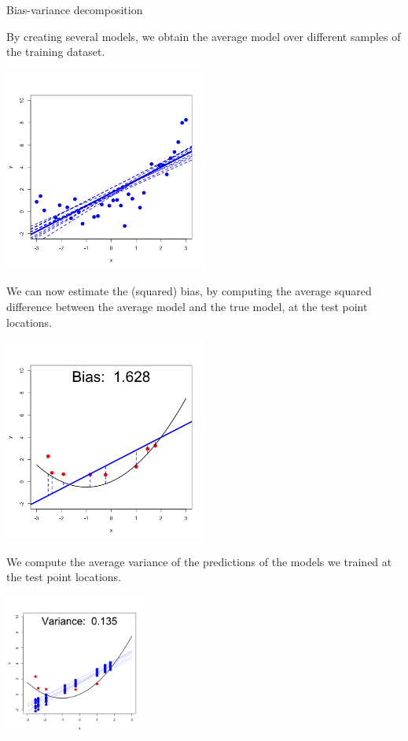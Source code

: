 \documentclass[11pt,compress,t,notes=noshow, xcolor=table]{beamer}
\begin{document}
\begin{vbframe} {Bias-variance decomposition}
\framebreak

By creating several models, we obtain the average model over different samples of the training dataset.

\begin{center}
  \includegraphics[width = 0.5\textwidth]{figure/bias_variance_decomposition-linear_model.png}
\end{center}

\framebreak

We can now estimate the (squared) bias, by computing the average squared difference between the average model and the true model, at the test point locations.

\begin{center}
  \includegraphics[width = 0.5\textwidth]{figure/bias_variance_decomposition-linear_model_bias.png}
\end{center}

\framebreak

We compute the average variance of the predictions of the models we trained at the test point locations.
\vspace{-0.35cm}
\begin{center}
  \includegraphics[width = 0.35\textwidth]{figure/bias_variance_decomposition-linear_model_variance.png}
\end{center}
\vspace{-0.8cm}


\end{vbframe}
\end{document}
